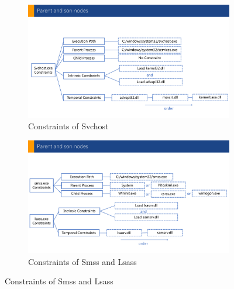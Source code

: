 \begin{figure}[h]
  \begin{subfigure}{.5\textwidth}
      \includegraphics[width=\textwidth]{figs/svchost_constraints.pdf}
      \caption{Constraints of Svchost}
      \label{fig:cons-svchost}
  \end{subfigure}
  \hfill
  \begin{subfigure}{.5\textwidth}
      \includegraphics[width=\textwidth]{figs/smss_lsass_constraints.pdf}
      \caption{Constraints of Smss and Lsass}
      \label{fig:cons-smss-lsass}
  \end{subfigure}


\end{figure}
